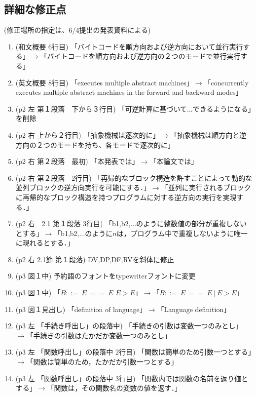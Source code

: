 \documentclass[a4j]{jarticle}
\begin{document}
\subsection*{詳細な修正点}

(修正場所の指定は、6/4提出の発表資料による)

\begin{enumerate}
\item (和文概要 6行目) 「バイトコードを順方向および逆方向において並行実行する」$\rightarrow$「バイトコードを順方向および逆方向の２つのモードで並行実行する」
\item (英文概要 8行目) 「executes multiple abstract machines」$\rightarrow$「concurrently executes multiple abstract machines in the forward and backward modes」
\item (p2 左 第１段落　下から３行目) 「可逆計算に基づいて...できるようになる」を削除
\item (p2 右 上から２行目) 「抽象機械は逐次的に」$\rightarrow$「抽象機械は順方向と逆方向の２つのモードを持ち、各モードで逐次的に」
\item (p2 右 第２段落　最初) 「本発表では」$\rightarrow$「本論文では」
\item (p2 右 第２段落　2行目) 「再帰的なブロック構造を許すことによって動的な並列ブロックの逆方向実行を可能にする．」$\rightarrow$「並列に実行されるブロックに再帰的なブロック構造を持つプログラムに対する逆方向の実行を実現する．」
\item (p2 右　2.1 第１段落 3行目) 「b1,b2,$\ldots$のように整数値の部分が重複しないとする」$\rightarrow$「b1,b2,$\ldots$のように$n$は，プログラム中で重複しないように唯一に現れるとする．」
\item (p2 右 2.1節 第１段落) DV,DP,DF,RVを斜体に修正
\item (p3 図１中) 予約語のフォントをtypewriterフォントに変更
\item (p3 図１中) 「$B::=\ E\ ==\ E$ $E>E$」$\rightarrow$「$B::=\ E\ ==\ E\ |\ E>E$」
\item (p3 図１見出し) 「definition of language」$\rightarrow$「Language definition」
\item (p3 左 「手続き呼出し」の段落中) 「手続きの引数は変数一つのみとし」$\rightarrow$「手続きの引数はたかだか変数一つのみとし」
\item (p3 左 「関数呼出し」の段落中 2行目) 「関数は簡単のため引数一つとする」$\rightarrow$「関数は簡単のため，たかだか引数一つとする」
\item (p3 左 「関数呼出し」の段落中 3行目) 「関数内では関数の名前を返り値とする」$\rightarrow$「関数は，その関数名の変数の値を返す．」

\end{enumerate}
\end{document}
